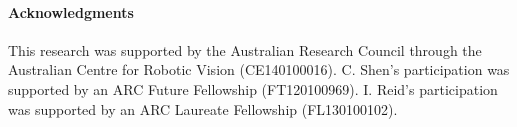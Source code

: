 \documentclass[10pt,twocolumn,letterpaper]{article}
\begin{document}
\paragraph{Acknowledgments}
This research was supported by the Australian Research Council
through the Australian Centre for Robotic Vision (CE140100016).
C. Shen's participation was supported by an ARC Future Fellowship (FT120100969).
I. Reid's participation was supported by an ARC Laureate Fellowship (FL130100102).



{\small


}
\end{document}

